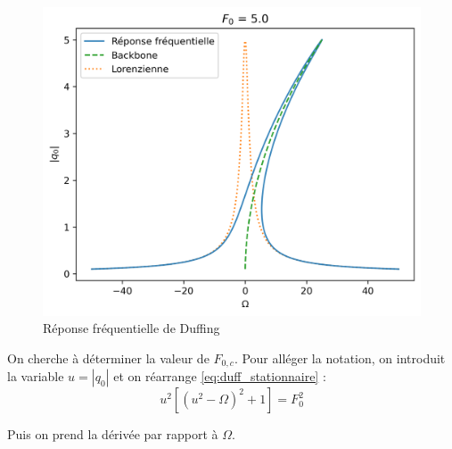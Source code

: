 \begin{figure}
\begin{subcaptionblock}{.31\linewidth}
      \includegraphics[width=\linewidth]{images/duffing/F0=5.0.png}
    \end{subcaptionblock}
    \caption{Réponse fréquentielle de Duffing}
\end{figure}
On cherche à déterminer la valeur de $F_{0, c}$. Pour alléger la notation, 
on introduit la variable $u = |q_0|$ et on réarrange \eqref{eq:duff_stationnaire} :
\begin{equation}
    u^2[(u^2 - \Omega)^2 + 1] = F_0^2
    \label{eq:duff_stationnaire_u}
\end{equation}

Puis on prend la dérivée par rapport à $\Omega$.

